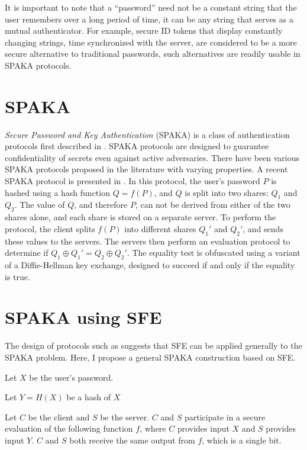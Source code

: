 It is important to note that a {}``password'' need not be a constant
string that the user remembers over a long period of time, it can
be any string that serves as a mutual authenticator. For example,
secure ID tokens that display constantly changing strings, time synchronized
with the server, are considered to be a more secure alternative to
traditional passwords, such alternatives are readily usable in SPAKA
protocols.


\section{SPAKA}

\emph{Secure Password and Key Authentication} (SPAKA) is a class of
authentication protocols first described in \cite{bellovin92}. SPAKA
protocols are designed to guarantee confidentiality of secrets even
against active adversaries. There have been various SPAKA protocols
proposed in the literature with varying properties. A recent SPAKA
protocol is presented in \cite{brainard03}. In this protocol, the
user's password $P$ is hashed using a hash function $Q=f(P)$, and
$Q$ is split into two shares: $Q_{1}$ and $Q_{2}$. The value of
$Q$, and therefore $P$, can not be derived from either of the two
shares alone, and each share is stored on a separate server. To perform
the protocol, the client splits $f(P)$ into different shares $Q_{1}'$
and $Q_{2}'$, and sends these values to the servers. The servers
then perform an evaluation protocol to determine if $Q_{1}\oplus Q_{1}'=Q_{2}\oplus Q_{2}'$.
The equality test is obfuscated using a variant of a Diffie-Hellman
key exchange, designed to succeed if and only if the equality is true.




\section{SPAKA using SFE\label{sub:SPAKA-using-SFE}}

The design of protocols such as \cite{brainard03} suggests that SFE
can be applied generally to the SPAKA problem. Here, I propose a general
SPAKA construction based on SFE.

Let $X$ be the user's password.

Let $Y=H(X)$ be a hash of $X$

Let $C$ be the client and $S$ be the server. $C$ and $S$ participate
in a secure evaluation of the following function $f$, where $C$
provides input $X$ and $S$ provides input $Y$. $C$ and $S$ both
receive the same output from $f$, which is a single bit.

